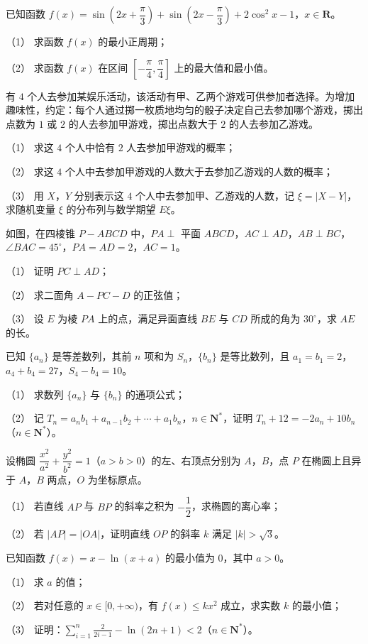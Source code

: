 \begin{question}
已知函数 $f(x)=\sin\left(2x+\dfrac\pi3\right)+\sin\left(2x-\dfrac\pi3\right)+2\cos^2x-1$，$x\in\mathbf R$。

（1） 求函数 $f(x)$ 的最小正周期；

（2） 求函数 $f(x)$ 在区间 $\left[-\dfrac\pi4,\dfrac\pi4\right]$ 上的最大值和最小值。

\end{question}
\begin{question}
有 $4$ 个人去参加某娱乐活动，该活动有甲、乙两个游戏可供参加者选择。为增加趣味性，约定：每个人通过掷一枚质地均匀的骰子决定自己去参加哪个游戏，掷出点数为 $1$ 或 $2$ 的人去参加甲游戏，掷出点数大于 $2$ 的人去参加乙游戏。

（1） 求这 $4$ 个人中恰有 $2$ 人去参加甲游戏的概率；

（2） 求这 $4$ 个人中去参加甲游戏的人数大于去参加乙游戏的人数的概率；

（3） 用 $X$，$Y$ 分别表示这 $4$ 个人中去参加甲、乙游戏的人数，记 $\xi=|X-Y|$，求随机变量 $\xi$ 的分布列与数学期望 $E\xi$。

\Needspace{0.4\textheight}
\end{question}
\begin{question}
如图，在四棱锥 $P-ABCD$ 中，$PA\perp$ 平面 $ABCD$，$AC\perp AD$，$AB\perp BC$，$\angle BAC=45^\circ$，$PA=AD=2$，$AC=1$。

（1） 证明 $PC\perp AD$；

（2） 求二面角 $A-PC-D$ 的正弦值；

（3） 设 $E$ 为棱 $PA$ 上的点，满足异面直线 $BE$ 与 $CD$ 所成的角为 $30^\circ$，求 $AE$ 的长。
\nopagebreak[4]
\begin{center}\end{center}
\nopagebreak[4]
\end{question}
\begin{question}
已知 $\{a_n\}$ 是等差数列，其前 $n$ 项和为 $S_n$，$\{b_n\}$ 是等比数列，且 $a_1=b_1=2$，$a_4+b_4=27$，$S_4-b_4=10$。

（1） 求数列 $\{a_n\}$ 与 $\{b_n\}$ 的通项公式；

（2） 记 $T_n=a_nb_1+a_{n-1}b_2+\cdots+a_1b_n$，$n\in\mathbf N^*$，证明 $T_n+12=-2a_n+10b_n$（$n\in\mathbf N^*$）。

\end{question}
\begin{question}
设椭圆 $\dfrac{x^2}{a^2}+\dfrac{y^2}{b^2}=1$（$a>b>0$）的左、右顶点分别为 $A$，$B$，点 $P$ 在椭圆上且异于 $A$，$B$ 两点，$O$ 为坐标原点。

（1） 若直线 $AP$ 与 $BP$ 的斜率之积为 $-\dfrac12$，求椭圆的离心率；

（2） 若 $|AP|=|OA|$，证明直线 $OP$ 的斜率 $k$ 满足 $|k|>\sqrt3$。

\end{question}
\begin{question}
已知函数 $f(x)=x-\ln(x+a)$ 的最小值为 $0$，其中 $a>0$。

（1） 求 $a$ 的值；

（2） 若对任意的 $x\in[0,+\infty)$，有 $f(x)\leqslant kx^2$ 成立，求实数 $k$ 的最小值；

（3） 证明：$\displaystyle\sum_{i=1}^{n}\frac{2}{2i-1}-\ln(2n+1)<2$（$n\in\mathbf N^*$）。

\end{question}